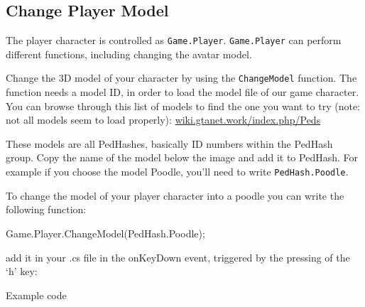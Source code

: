 \documentclass[
  openany]{book}
\newenvironment{Shaded}{\begin{snugshade}}{\end{snugshade}}
\newcommand{\FunctionTok}[1]{\textcolor[rgb]{0.00,0.00,0.00}{#1}}
\newcommand{\NormalTok}[1]{#1}
\begin{document}
\hypertarget{change-player-model}{%
\subsection*{Change Player Model}\label{change-player-model}}

The player character is controlled as \texttt{Game.Player}. \texttt{Game.Player} can perform different functions, including changing the avatar model.

Change the 3D model of your character by using the \texttt{ChangeModel} function.
The function needs a model ID, in order to load the model file of our game character.
You can browse through this list of models to find the one you want to try (note: not all models seem to load properly): \href{https://wiki.gtanet.work/index.php/Peds}{wiki.gtanet.work/index.php/Peds}

These models are all PedHashes, basically ID numbers within the PedHash group. Copy the name of the model below the image and add it to PedHash.
For example if you choose the model Poodle, you'll need to write \texttt{PedHash.Poodle}.

To change the model of your player character into a poodle you can write the following function:

\begin{Shaded}
\begin{Highlighting}[]
\NormalTok{Game.}\FunctionTok{Player}\NormalTok{.}\FunctionTok{ChangeModel}\NormalTok{(PedHash.}\FunctionTok{Poodle}\NormalTok{);}
\end{Highlighting}
\end{Shaded}

add it in your .cs file in the onKeyDown event, triggered by the pressing of the `h' key:

Example code
\end{document}
